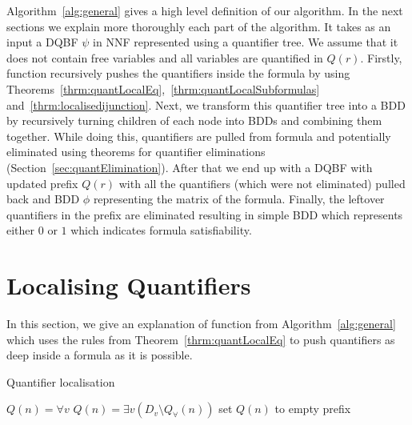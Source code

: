 \documentclass[
  digital, %
  color,
  twoside, %
  table,   %
  nolof,     %
  nolot,     %
]{fithesis3}
\theoremstyle{definition}
\theoremstyle{remark}
\newcommand{\qtlabel}[1]{l({#1})}
\newcommand{\prefix}[1]{Q({#1})}
\newcommand{\eprefix}[1]{Q_{\exists}(#1)}
\newcommand{\uprefix}[1]{Q_{\forall}(#1)}
\newcommand{\children}[1]{children({#1})}
\begin{document}
Algorithm~\ref{alg:general} gives a high level definition of our algorithm. In the next sections we explain more thoroughly each part of the algorithm. It takes as an input a DQBF $\psi$ in NNF represented using a quantifier tree. We assume that it does not contain free variables and all variables are quantified in $\prefix{r}$. Firstly, function  recursively pushes the quantifiers inside the formula by using Theorems~\ref{thrm:quantLocalEq},~\ref{thrm:quantLocalSubformulas} and~\ref{thrm:localisedijunction}. Next, we transform this quantifier tree into a BDD by recursively turning children of each node into BDDs and combining them together. While doing this, quantifiers are pulled from formula and potentially eliminated using theorems for quantifier eliminations (Section~\ref{sec:quantElimination}). After that we end up with a DQBF with updated prefix $\prefix{r}$ with all the quantifiers (which were not eliminated) pulled back and BDD $\phi$ representing the matrix of the formula. Finally, the leftover quantifiers in the prefix are eliminated resulting in simple BDD which represents either $0$ or $1$ which indicates formula satisfiability.

\section{Localising Quantifiers}
\label{sec:alglocalise}
In this section, we give an explanation of function  from Algorithm~\ref{alg:general} which uses the rules from Theorem~\ref{thrm:quantLocalEq} to push quantifiers as deep inside a formula as it is possible.

\begin{algorithm}
  \caption{Quantifier localisation}
  \label{alg:localise}
  \begin{algorithmic}[1]
      \If{$\qtlabel{n} = {\land}$}
        \State {}\label{localise:calland}
      \ElsIf{$\qtlabel{n} = {\lor}$}
        \State {}\label{localise:callor}
      \ElsIf{$\qtlabel{n} = v$ or $\qtlabel{n} = \neg v$}
        \If{$v \in \uprefix{n}$}
          \State $\prefix{n} = \forall v$
        \ElsIf{$v \in \eprefix{n}$}
          \State $\prefix{n} = \exists v(D_v \setminus \uprefix{n})$
        \Else
          \State set $\prefix{n}$ to empty prefix
        \EndIf
      \EndIf
      \ForAll{$n' \in \children{n}$}
        \State {}\label{localise:callchildren}
      \EndFor
    \EndFunction
  \end{algorithmic}
\end{algorithm}
\end{document}
